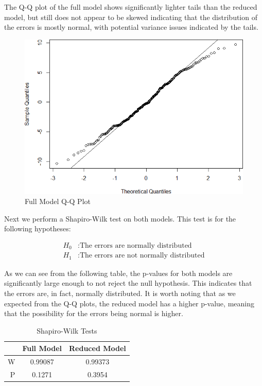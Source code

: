 \documentclass[a4paper, 11pt]{article}
\begin{document}
The Q-Q plot of the full model shows significantly lighter tails than the reduced model, but still does not appear to be skewed indicating that the distribution of the errors is mostly normal, with potential variance issues indicated by the tails.
\begin{figure}[H]
	\centering
	\caption{Full Model Q-Q Plot}
	\includegraphics[width=\textwidth]{full_qq_plot.png}
\end{figure}

Next we perform a Shapiro-Wilk test on both models. This test is for the following hypotheses:
\vspace{-1cm}
\begin{center}
	\begin{align*}
		H_0&: \text{The errors are normally distributed}\\
		H_1&: \text{The errors are not normally distributed}
	\end{align*}
\end{center}

As we can see from the following table, the p-values for both models are significantly large enough to not reject the null hypothesis. This indicates that the errors are, in fact, normally distributed. It is worth noting that as we expected from the Q-Q plots, the reduced model has a higher p-value, meaning that the possibility for the errors being normal is higher.
\begin{table}[H]
	\centering
	\begin{tabular}{ r | c | c }
		& Full Model & Reduced Model \\ \hline
		W & 0.99087 & 0.99373 \\
		P & 0.1271 & 0.3954
	\end{tabular}
	\caption{Shapiro-Wilk Tests}
	\label{table:SW}
\end{table}
\end{document}
